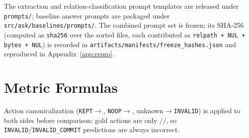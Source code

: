 The extraction and relation-classification prompt templates are released under
\texttt{prompts/}; baseline answer prompts are packaged under
\texttt{src/ask/baselines/prompts/}. The combined prompt set is frozen; its
SHA-256 (computed as
\texttt{sha256} over the sorted files, each contributed as
\texttt{relpath + NUL + bytes + NUL}) is recorded in
\texttt{artifacts/manifests/freeze\_hashes.json} and reproduced in
Appendix~\ref{app:repro}.

\section{Metric Formulas}
\label{app:metrics}

Action canonicalization (\texttt{KEPT}$\to$\keep, \texttt{NOOP}$\to$\abstain,
unknown$\to$\texttt{INVALID}) is applied to both sides before comparison; gold
actions are only \keep/\supersede/\abstain, so \texttt{INVALID}/\texttt{INVALID\_COMMIT}
predictions are always incorrect.

